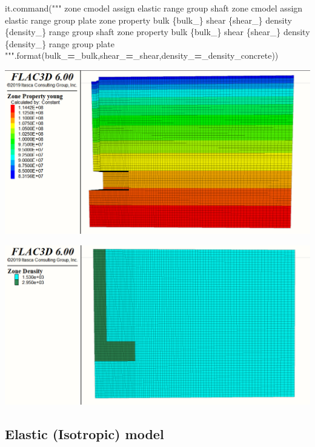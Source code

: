 \documentclass[a4paper, nobind]{templates/ociamthesis}
\newenvironment{Shaded}{\begin{snugshade}}{\end{snugshade}}
\newcommand{\BuiltInTok}[1]{#1}
\newcommand{\NormalTok}[1]{#1}
\newcommand{\OperatorTok}[1]{\textcolor[rgb]{0.81,0.36,0.00}{\textbf{#1}}}
\newcommand{\SpecialCharTok}[1]{\textcolor[rgb]{0.00,0.00,0.00}{#1}}
\newcommand{\StringTok}[1]{\textcolor[rgb]{0.31,0.60,0.02}{#1}}
\renewenvironment{Shaded}
{
  \vspace{10pt}%
  \begin{snugshade}%
}{%
  \end{snugshade}%
  \vspace{8pt}%
}
\begin{document}
\begin{Shaded}
\begin{Highlighting}[]
\NormalTok{it.command(}\StringTok{"""}
\StringTok{zone cmodel assign elastic range group \textquotesingle{}shaft\textquotesingle{}}
\StringTok{zone cmodel assign elastic range group \textquotesingle{}plate\textquotesingle{}}
\StringTok{zone property bulk }\SpecialCharTok{\{bulk\_\}}\StringTok{ shear }\SpecialCharTok{\{shear\_\}}\StringTok{ density }\SpecialCharTok{\{density\_\}}\StringTok{ range group \textquotesingle{}shaft\textquotesingle{}}
\StringTok{zone property bulk }\SpecialCharTok{\{bulk\_\}}\StringTok{ shear }\SpecialCharTok{\{shear\_\}}\StringTok{ density }\SpecialCharTok{\{density\_\}}\StringTok{ range group \textquotesingle{}plate\textquotesingle{}}
\StringTok{"""}\NormalTok{.}\BuiltInTok{format}\NormalTok{(bulk\_}\OperatorTok{=}\NormalTok{\_bulk,shear\_}\OperatorTok{=}\NormalTok{\_shear,density\_}\OperatorTok{=}\NormalTok{\_density\_concrete))}
\end{Highlighting}
\end{Shaded}

\includegraphics[width=1\linewidth]{myfigureeeeee/1_young}

\includegraphics[width=1\linewidth]{myfigureeeeee/1_density}

\hypertarget{elastic-isotropic-model}{%
\subsection{Elastic (Isotropic) model}\label{elastic-isotropic-model}}
\end{document}
